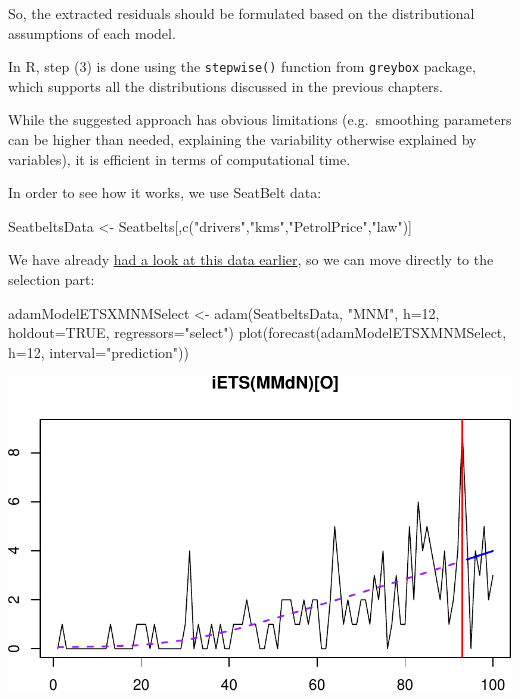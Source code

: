 \documentclass[
]{book}
\newenvironment{Shaded}{\begin{snugshade}}{\end{snugshade}}
\newcommand{\AttributeTok}[1]{\textcolor[rgb]{0.77,0.63,0.00}{#1}}
\newcommand{\ConstantTok}[1]{\textcolor[rgb]{0.00,0.00,0.00}{#1}}
\newcommand{\DecValTok}[1]{\textcolor[rgb]{0.00,0.00,0.81}{#1}}
\newcommand{\FunctionTok}[1]{\textcolor[rgb]{0.00,0.00,0.00}{#1}}
\newcommand{\NormalTok}[1]{#1}
\newcommand{\OtherTok}[1]{\textcolor[rgb]{0.56,0.35,0.01}{#1}}
\newcommand{\StringTok}[1]{\textcolor[rgb]{0.31,0.60,0.02}{#1}}
\theoremstyle{definition}
\theoremstyle{definition}
\theoremstyle{definition}
\theoremstyle{definition}
\theoremstyle{remark}
\begin{document}
So, the extracted residuals should be formulated based on the distributional assumptions of each model.

In R, step (3) is done using the \texttt{stepwise()} function from \texttt{greybox} package, which supports all the distributions discussed in the previous chapters.

While the suggested approach has obvious limitations (e.g.~smoothing parameters can be higher than needed, explaining the variability otherwise explained by variables), it is efficient in terms of computational time.

In order to see how it works, we use SeatBelt data:

\begin{Shaded}
\begin{Highlighting}[]
\NormalTok{SeatbeltsData }\OtherTok{\textless{}{-}}\NormalTok{ Seatbelts[,}\FunctionTok{c}\NormalTok{(}\StringTok{"drivers"}\NormalTok{,}\StringTok{"kms"}\NormalTok{,}\StringTok{"PetrolPrice"}\NormalTok{,}\StringTok{"law"}\NormalTok{)]}
\end{Highlighting}
\end{Shaded}

We have already \protect\hyperlink{ETSXRExample}{had a look at this data earlier}, so we can move directly to the selection part:

\begin{Shaded}
\begin{Highlighting}[]
\NormalTok{adamModelETSXMNMSelect }\OtherTok{\textless{}{-}} \FunctionTok{adam}\NormalTok{(SeatbeltsData, }\StringTok{"MNM"}\NormalTok{,}
                               \AttributeTok{h=}\DecValTok{12}\NormalTok{, }\AttributeTok{holdout=}\ConstantTok{TRUE}\NormalTok{,}
                               \AttributeTok{regressors=}\StringTok{"select"}\NormalTok{)}
\FunctionTok{plot}\NormalTok{(}\FunctionTok{forecast}\NormalTok{(adamModelETSXMNMSelect, }\AttributeTok{h=}\DecValTok{12}\NormalTok{, }\AttributeTok{interval=}\StringTok{"prediction"}\NormalTok{))}
\end{Highlighting}
\end{Shaded}

\includegraphics{adam_files/figure-latex/unnamed-chunk-173-1.pdf}
\end{document}
